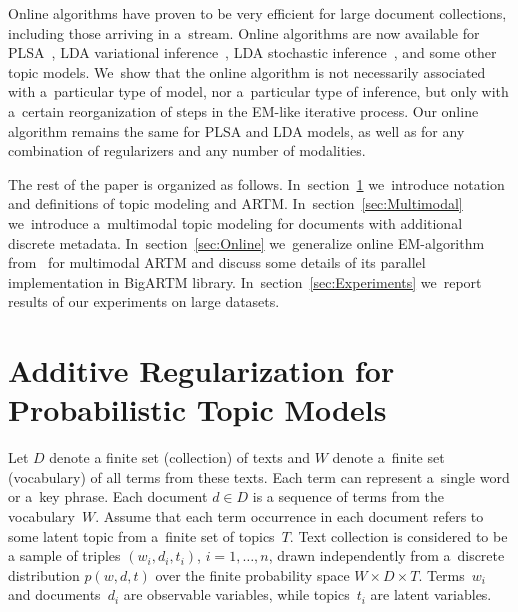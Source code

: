 \documentclass{sig-alternate-2013}
\begin{document}
Online algorithms have proven to be very efficient
for large document collections, including those arriving in a~stream.
Online algorithms are now available for
PLSA~\cite{bassiou14online},
LDA variational inference~\cite{hoffman10online},
LDA stochastic inference~\cite{mimno12sparse}, and
some other topic models.
We~show that the online algorithm is not necessarily associated with
a~particular type of model, nor
a~particular type of inference,
but only with a~certain reorganization of steps in the EM-like iterative process.
Our online algorithm remains the same for PLSA and LDA models,
as well as for any combination of regularizers and any number of modalities.

The rest of the paper is organized as follows.
%
In~section~\ref{sec:ARTM}
we~introduce notation and definitions of topic modeling and ARTM.
%
In~section~\ref{sec:Multimodal}
we~introduce a~multimodal topic modeling for documents with additional discrete metadata.
%
In~section~\ref{sec:Online}
we~generalize online EM-algorithm from~\cite{hoffman10online} for multimodal ARTM
%
and discuss some details of its parallel implementation in BigARTM library.
%
In~section~\ref{sec:Experiments}
we~report results of our experiments on large datasets.
%

\section{Additive Regularization for\\ Probabilistic Topic Models}
\label{sec:ARTM}


Let
$D$ denote a finite set (collection) of texts and
$W$ denote a~finite set (vocabulary) of all terms from these texts.
Each term can represent a~single word or a~key phrase.
Each document ${d\in D}$ is a sequence of terms from the vocabulary~$W$.
Assume that
each term occurrence in each document refers to some latent topic from a~finite set of topics~$T$.
Text collection is considered to be a sample of triples
$(w_i,d_i,t_i)$,\; ${i=1,\dots,n}$,
drawn independently from a~discrete distribution $p(w,d,t)$
over the finite probability space $W\times D \times T$.
Terms~$w_i$ and documents~$d_i$ are observable variables,
while topics~$t_i$ are latent variables.
\end{document}
